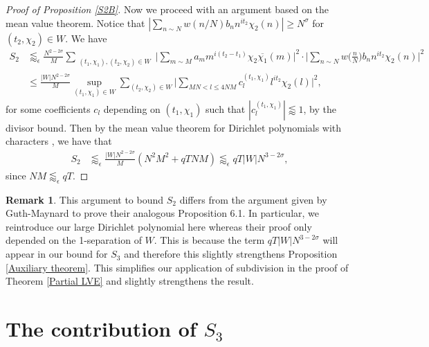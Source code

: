 \documentclass[12pt]{amsart}
\theoremstyle{definition}
\newtheorem{remark}[theorem]{Remark}
\theoremstyle{plain}
\theoremstyle{remark}
\numberwithin{equation}{section}
\numberwithin{theorem}{section}
\numberwithin{equation}{section}
\begin{document}
\begin{proof}[Proof of Proposition \ref{S2B}]
		Now we proceed with an argument based on the mean value theorem. Notice that $|{\sum_{n \sim N} w(n/N)b_n n^{it_2}\chi_2(n)}| \geq N^{\sigma}$ for $(t_2,\chi_2) \in W$. We have  
		\begin{align*}
			S_{2} &\lessapprox_{\epsilon}  \frac{N^{2-2\sigma}}{M}\sum_{\substack{(t_1,\chi_1),(t_2,\chi_2) \in W}} \bigg|\sum_{m \sim M} a_m m^{i(t_2-t_1)} \chi_2\overline{\chi_1}(m)\bigg|^2 \cdot \bigg|\sum_{n \sim N} w\bigg(\frac{n}{N}\bigg)b_n n^{it_2} \chi_2(n)\bigg|^2 \\
			& \leq \frac{|W| N^{2-2\sigma}}{M}\sup\limits_{(t_1,\chi_1) \in W} \sum_{(t_2,\chi_2) \in W} \bigg|\sum_{MN < l \leq 4NM} c_l^{(t_1,\chi_1)}l^{it_2}\chi_2(l)\bigg|^2,
		\end{align*}
		for some coefficients $c_l$ depending on $(t_1,\chi_1)$ such that $|c_l^{(t_1,\chi_1)}| \lessapprox 1$, by the divisor bound. Then by the mean value theorem for Dirichlet polynomials with characters \cite[Theorem 9.12]{iwanieckowalski}, we have that
		\begin{align*}
			S_{2}& \lessapprox_{\epsilon} \frac{|W|N^{2-2\sigma}}{M}(N^2M^2+qTNM) \lessapprox_{\epsilon} qT|W|N^{3-2\sigma},
		\end{align*}
		since $NM \lessapprox_{\epsilon} qT$. 
	\end{proof}
	\begin{remark}
		This argument to bound $S_2$ differs from the argument given by Guth-Maynard to prove their analogous Proposition 6.1. In particular, we reintroduce our large Dirichlet polynomial here whereas their proof only depended on the 1-separation of $W$. This is because the term $qT|W|N^{3-2\sigma}$ will appear in our bound for $S_3$ and therefore this slightly strengthens Proposition \ref{Auxiliary theorem}. This simplifies our application of subdivision in the proof of Theorem \ref{Partial LVE} and slightly strengthens the result. 
	\end{remark}
	
	\section{\texorpdfstring{The contribution of $S_{3}$}
		{The contribution of S3}}\label{TCS3}
	
\end{document}
